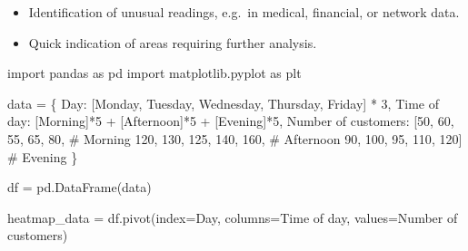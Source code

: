\documentclass[
  english,
  letterpaper,
  DIV=11,
  numbers=noendperiod]{scrreprt}
\newenvironment{Shaded}{\begin{snugshade}}{\end{snugshade}}
\newcommand{\CommentTok}[1]{\textcolor[rgb]{0.37,0.37,0.37}{#1}}
\newcommand{\DecValTok}[1]{\textcolor[rgb]{0.68,0.00,0.00}{#1}}
\newcommand{\ImportTok}[1]{\textcolor[rgb]{0.00,0.46,0.62}{#1}}
\newcommand{\NormalTok}[1]{\textcolor[rgb]{0.00,0.23,0.31}{#1}}
\newcommand{\OperatorTok}[1]{\textcolor[rgb]{0.37,0.37,0.37}{#1}}
\newcommand{\StringTok}[1]{\textcolor[rgb]{0.13,0.47,0.30}{#1}}
\providecommand{\tightlist}{%
  \setlength{\itemsep}{0pt}\setlength{\parskip}{0pt}}
\begin{document}
\begin{enumerate}
  \begin{itemize}
  \tightlist
  \item
    Identification of unusual readings, e.g.~in medical, financial, or
    network data.\\
  \item
    Quick indication of areas requiring further analysis.
  \end{itemize}
\end{enumerate}

\begin{Shaded}
\begin{Highlighting}[]
\ImportTok{import}\NormalTok{ pandas }\ImportTok{as}\NormalTok{ pd}
\ImportTok{import}\NormalTok{ matplotlib.pyplot }\ImportTok{as}\NormalTok{ plt}

\NormalTok{data }\OperatorTok{=}\NormalTok{ \{}
    \StringTok{\textquotesingle{}Day\textquotesingle{}}\NormalTok{: [}\StringTok{\textquotesingle{}Monday\textquotesingle{}}\NormalTok{, }\StringTok{\textquotesingle{}Tuesday\textquotesingle{}}\NormalTok{, }\StringTok{\textquotesingle{}Wednesday\textquotesingle{}}\NormalTok{, }\StringTok{\textquotesingle{}Thursday\textquotesingle{}}\NormalTok{, }\StringTok{\textquotesingle{}Friday\textquotesingle{}}\NormalTok{] }\OperatorTok{*} \DecValTok{3}\NormalTok{,}
    \StringTok{\textquotesingle{}Time of day\textquotesingle{}}\NormalTok{: [}\StringTok{\textquotesingle{}Morning\textquotesingle{}}\NormalTok{]}\OperatorTok{*}\DecValTok{5} \OperatorTok{+}\NormalTok{ [}\StringTok{\textquotesingle{}Afternoon\textquotesingle{}}\NormalTok{]}\OperatorTok{*}\DecValTok{5} \OperatorTok{+}\NormalTok{ [}\StringTok{\textquotesingle{}Evening\textquotesingle{}}\NormalTok{]}\OperatorTok{*}\DecValTok{5}\NormalTok{,}
    \StringTok{\textquotesingle{}Number of customers\textquotesingle{}}\NormalTok{: [}\DecValTok{50}\NormalTok{, }\DecValTok{60}\NormalTok{, }\DecValTok{55}\NormalTok{, }\DecValTok{65}\NormalTok{, }\DecValTok{80}\NormalTok{,    }\CommentTok{\# Morning}
                            \DecValTok{120}\NormalTok{, }\DecValTok{130}\NormalTok{, }\DecValTok{125}\NormalTok{, }\DecValTok{140}\NormalTok{, }\DecValTok{160}\NormalTok{,  }\CommentTok{\# Afternoon}
                            \DecValTok{90}\NormalTok{, }\DecValTok{100}\NormalTok{, }\DecValTok{95}\NormalTok{, }\DecValTok{110}\NormalTok{, }\DecValTok{120}\NormalTok{]    }\CommentTok{\# Evening}
\NormalTok{\}}

\NormalTok{df }\OperatorTok{=}\NormalTok{ pd.DataFrame(data)}


\NormalTok{heatmap\_data }\OperatorTok{=}\NormalTok{ df.pivot(index}\OperatorTok{=}\StringTok{\textquotesingle{}Day\textquotesingle{}}\NormalTok{, columns}\OperatorTok{=}\StringTok{\textquotesingle{}Time of day\textquotesingle{}}\NormalTok{, values}\OperatorTok{=}\StringTok{\textquotesingle{}Number of customers\textquotesingle{}}\NormalTok{)}


\end{Highlighting}
\end{Shaded}
\end{document}
